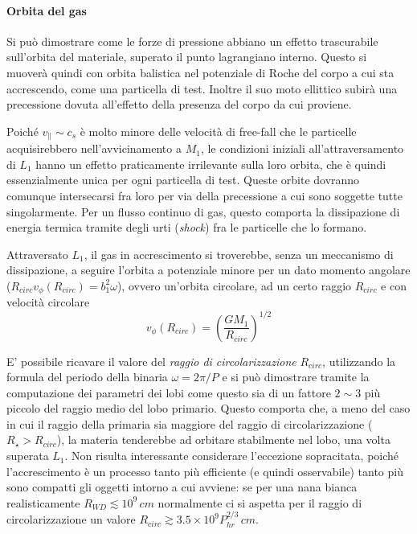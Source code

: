 \documentclass[a4paperbi]{article}
\begin{document}
	\paragraph{Orbita del gas}	
	Si può dimostrare come le forze di pressione abbiano un effetto trascurabile sull'orbita del materiale, superato il punto lagrangiano interno. Questo si muoverà quindi con orbita balistica nel potenziale di Roche del corpo a cui sta accrescendo, come una particella di test. Inoltre il suo moto ellittico subirà una precessione dovuta all'effetto della presenza del corpo da cui proviene.
	
	Poiché $v_\parallel\sim c_s$ è molto minore delle velocità di free-fall che le particelle acquisirebbero nell'avvicinamento a $M_1$, le condizioni iniziali all'attraversamento di $L_1$ hanno un effetto praticamente irrilevante sulla loro orbita, che è quindi essenzialmente unica per ogni particella di test. Queste orbite dovranno comunque intersecarsi fra loro per via della precessione a cui sono soggette tutte singolarmente. Per un flusso continuo di gas, questo comporta la dissipazione di energia termica tramite degli urti (\textit{shock}) fra le particelle che lo formano. 
	
	Attraversato $L_1$, il gas in accrescimento si troverebbe, senza un meccanismo di dissipazione, a seguire l'orbita a potenziale minore per un dato momento angolare ($R_{circ}v_\phi(R_{circ})=b_1^2\omega$), ovvero un'orbita circolare, ad un certo raggio $R_{circ}$ e con velocità circolare
	\begin{equation}
		v_\phi(R_{circ})=\left(\frac{GM_1}{R_{circ}}\right)^{1/2}
	\end{equation}
	
	E' possibile ricavare il valore del \textit{raggio di circolarizzazione} $R_{circ}$, utilizzando la formula del periodo della binaria $\omega=2\pi/P$ e si può dimostrare tramite la computazione dei parametri dei lobi come questo sia di un fattore $2\sim3$ più piccolo del raggio medio del lobo primario. Questo comporta che, a meno del caso in cui il raggio della primaria sia maggiore del raggio di circolarizzazione ($R_\star>R_{circ}$), la materia tenderebbe ad orbitare stabilmente nel lobo, una volta superata $L_1$.
	Non risulta interessante considerare l'eccezione sopracitata, poiché l'accrescimento è un processo tanto più efficiente (e quindi osservabile) tanto più sono compatti gli oggetti intorno a cui avviene: se per una nana bianca realisticamente $R_{WD}\lesssim10^9\,cm$ normalmente ci si aspetta per il raggio di circolarizzazione un valore $R_{circ}\gtrsim3.5\times10^9P_{hr}^{2/3}\,cm$.
\end{document}
